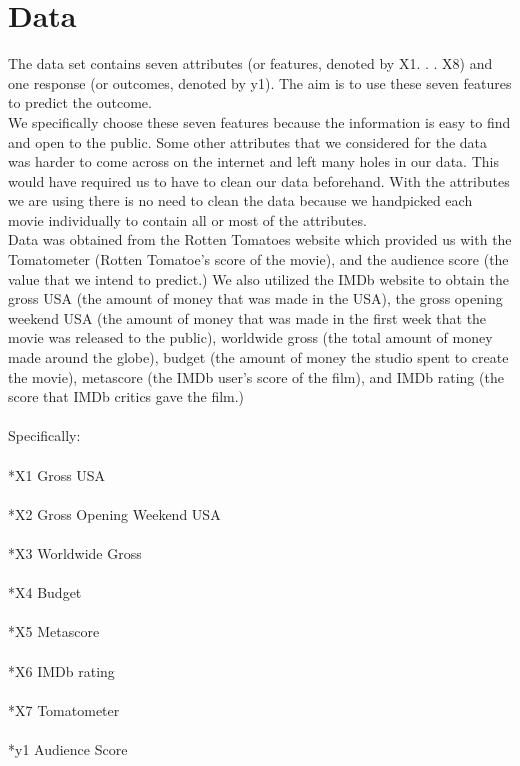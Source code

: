 \documentclass[10pt,twocolumn,letterpaper]{article}
\begin{document}
\section{Data}
	The data set contains seven attributes (or features, denoted by X1. . . X8) and
	one response (or outcomes, denoted by y1). The aim is to use these seven
	features to predict the outcome.\\
	We specifically choose these seven features because the information is easy to find
	and open to the public. Some other attributes that we considered for the data was
	harder to come across on the internet and left many holes in our data. This would have
	required us to have to clean our data beforehand. With the attributes we are using
	there is no need to clean the data because we handpicked each movie individually to
	contain all or most of the attributes.\\
	Data was obtained from the Rotten Tomatoes website which provided us with the
	Tomatometer (Rotten Tomatoe's score of the movie), and the audience score (the value
	that we intend to predict.) We also utilized the IMDb website to obtain the gross USA
	(the amount of money that was made in the USA), the gross opening weekend USA (the amount
	of money that was made in the first week that the movie was released to the public),
	worldwide gross (the total amount of money made around the globe), budget (the amount of
	money the studio spent to create the movie), metascore (the IMDb user's score of the
	film), and IMDb rating (the score that IMDb critics gave the film.)
	\\\\Specifically:\\
	\\*X1 Gross USA\\
	\\*X2 Gross Opening Weekend USA\\
	\\*X3 Worldwide Gross\\
	\\*X4 Budget\\
	\\*X5 Metascore\\
	\\*X6 IMDb rating\\
	\\*X7 Tomatometer\\
	\\*y1 Audience Score\\\\
	
\end{document}
